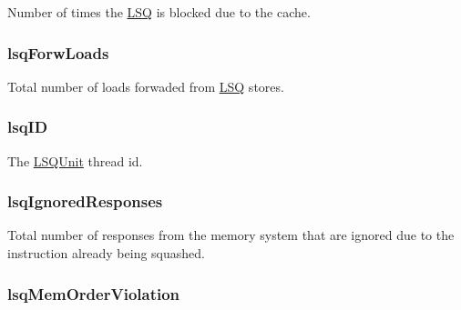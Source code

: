 \label{classLSQUnit_a33a1cca2455a3e5909f462a778902643}
Number of times the \hyperlink{classLSQ}{LSQ} is blocked due to the cache. \hypertarget{classLSQUnit_a2adecfd8b85711a16f91e0fbd7ca8f10}{
\subsubsection[{lsqForwLoads}]{ {\bf lsqForwLoads}}}
\label{classLSQUnit_a2adecfd8b85711a16f91e0fbd7ca8f10}
Total number of loads forwaded from \hyperlink{classLSQ}{LSQ} stores. \hypertarget{classLSQUnit_a0ee490ba978f48fbf2579acc7eb60b24}{
\subsubsection[{lsqID}]{ {\bf lsqID}}}
\label{classLSQUnit_a0ee490ba978f48fbf2579acc7eb60b24}
The \hyperlink{classLSQUnit}{LSQUnit} thread id. \hypertarget{classLSQUnit_ad620ac240b0d631c3a8aa19cfd05ad41}{
\subsubsection[{lsqIgnoredResponses}]{ {\bf lsqIgnoredResponses}}}
\label{classLSQUnit_ad620ac240b0d631c3a8aa19cfd05ad41}
Total number of responses from the memory system that are ignored due to the instruction already being squashed. \hypertarget{classLSQUnit_ac499fc2b461e03a110deae7c695f75bc}{
\subsubsection[{lsqMemOrderViolation}]{ {\bf lsqMemOrderViolation}}}
